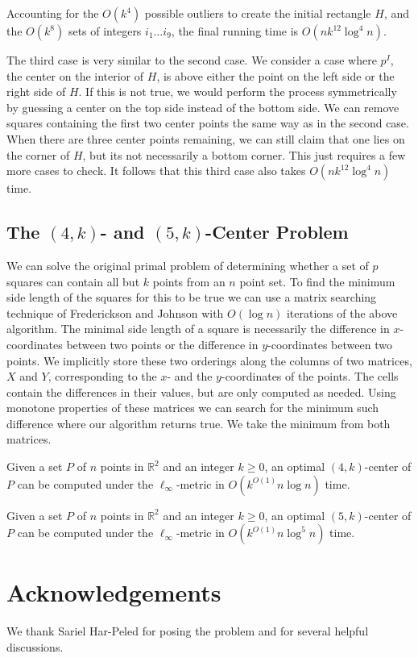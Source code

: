 \documentclass[11pt]{myclass}
\renewcommand{\b}[1]{\ensuremath{\mathbb{#1}}}
\begin{document}
Accounting for the $O(k^4)$ possible outliers to create the initial rectangle $H$, and the $O(k^8)$ sets of integers $i_1 \ldots i_9$, the final running time is $O(n k^{12} \log^4 n)$.  

The third case is very similar to the second case.  We consider a case where $p^I$, the center on the interior of $H$, is above either the point on the left side or the right side of $H$.  If this is not true, we would perform the process symmetrically by guessing a center on the top side instead of the bottom side.  We can remove squares containing the first two center points the same way as in the second case.  When there are three center points remaining, we can still claim that one lies on the corner of $H$, but its not necessarily a bottom corner.  This just requires a few more cases to check.  It follows that this third case also takes $O(n k^{12} \log^4 n)$ time.











\subsection{The $(4,k)$- and $(5,k)$-Center Problem}
We can solve the original primal problem of determining whether a set of $p$ squares can contain all but $k$ points from an $n$ point set.  To find the minimum side length of the squares for this to be true we can use a matrix searching technique of Frederickson and Johnson \cite{FJ82,FJ83,FJ84} with $O(\log n)$ iterations of the above algorithm.  The minimal side length of a square is necessarily the difference in $x$-coordinates between two points or the difference in $y$-coordinates between two points.  We implicitly store these two orderings along the columns of two matrices, $X$ and $Y$, corresponding to the $x$- and the $y$-coordinates of the points.  The cells contain the differences in their values, but are only computed as needed.  Using monotone properties of these matrices we can search for the minimum such difference where our algorithm returns true.  We take the minimum from both matrices.  

\begin{theorem}
Given a set $P$ of $n$ points in $\b{R}^2$ and an integer $k \geq 0$, an optimal $(4,k)$-center of $P$ can be computed under the $\ell_\infty$-metric in $O(k^{O(1)} n \log n)$ time.
\end{theorem}

\begin{theorem}
Given a set $P$ of $n$ points in $\b{R}^2$ and an integer $k \geq 0$, an optimal $(5,k)$-center of $P$ can be computed under the $\ell_\infty$-metric in $O(k^{O(1)} n \log^5 n)$ time.  
\end{theorem}

\section*{Acknowledgements}
We thank Sariel Har-Peled for posing the problem and for several helpful discussions.  



\end{document}
